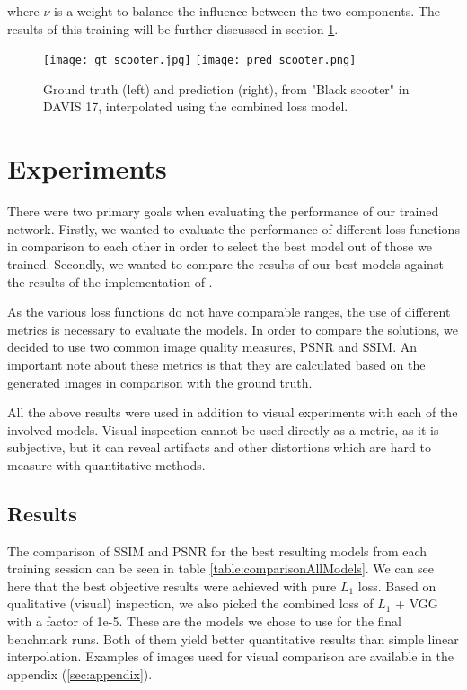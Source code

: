 \documentclass[10pt,twocolumn,letterpaper]{article}
\begin{document}
where $\nu$ is a weight to balance the influence between the two components. The results of this training will be further discussed in section \ref{sec:experiments}.


\begin{figure*}
    \begin{center}
    	\texttt{[image: gt\_scooter.jpg]}
    	\texttt{[image: pred\_scooter.png]}
    \end{center}
    \caption{Ground truth (left) and prediction (right), from "Black scooter" in DAVIS 17, interpolated using the combined loss model.}
    \label{fig:scooter}
\end{figure*}


\section{Experiments}
\label{sec:experiments}

There were two primary goals when evaluating the performance of our trained network. Firstly, we wanted to evaluate the performance of different loss functions in comparison to each other in order to select the best model out of those we trained. Secondly, we wanted to compare the results of our best models against the results of the implementation of \citeauthor{SepConv}.

As the various loss functions do not have comparable ranges, the use of different metrics is necessary to evaluate the models. In order to compare the solutions, we decided to use two common image quality measures, PSNR and SSIM. An important note about these metrics is that they are calculated based on the generated images in comparison with the ground truth.

All the above results were used in addition to visual experiments with each of the involved models. Visual inspection cannot be used directly as a metric, as it is subjective, but it can reveal artifacts and other distortions which are hard to measure with quantitative methods.


\subsection{Results}
\label{sec:results}

The comparison of SSIM and PSNR for the best resulting models from each training session can be seen in table \ref{table:comparisonAllModels}. We can see here that the best objective results were achieved with pure $L_1$ loss. Based on qualitative (visual) inspection, we also picked the combined loss of $L_1$ + VGG with a factor of 1e-5. These are the models we chose to use for the final benchmark runs. Both of them yield better quantitative results than simple linear interpolation. Examples of images used for visual comparison are available in the appendix (\ref{sec:appendix}).
\end{document}
